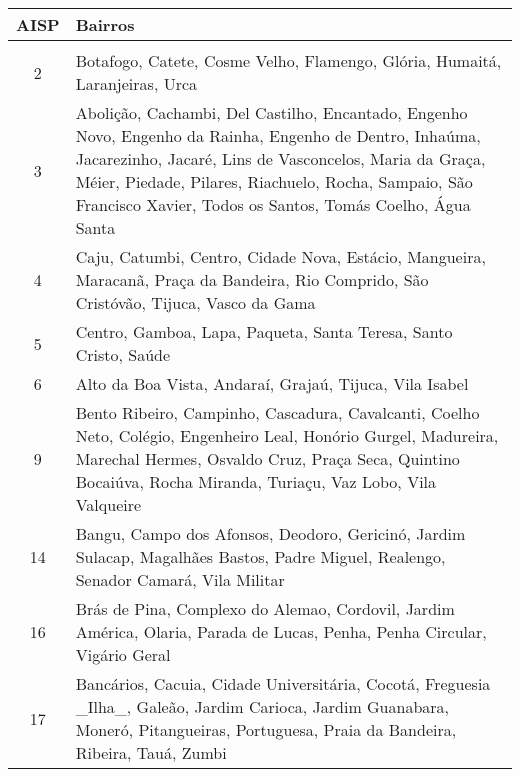 
\begin{table}
\begin{tabular}{cp{12cm}}
\toprule
 AISP &                                                                                                                                                                                                                                                                                  Bairros \\
\midrule
      &                                                                                                                                                                                                                                                                                          \\
 2 &  Botafogo, Catete, Cosme Velho, Flamengo, Glória, Humaitá, Laranjeiras, Urca \\
 3 &  Abolição, Cachambi, Del Castilho, Encantado, Engenho Novo, Engenho da Rainha, Engenho de Dentro, Inhaúma, Jacarezinho, Jacaré, Lins de Vasconcelos, Maria da Graça, Méier, Piedade, Pilares, Riachuelo, Rocha, Sampaio, São Francisco Xavier, Todos os Santos, Tomás Coelho, Água Santa \\
 4 &  Caju, Catumbi, Centro, Cidade Nova, Estácio, Mangueira, Maracanã, Praça da Bandeira, Rio Comprido, São Cristóvão, Tijuca, Vasco da Gama \\
 5 &  Centro, Gamboa, Lapa, Paqueta, Santa Teresa, Santo Cristo, Saúde \\
 6 &  Alto da Boa Vista, Andaraí, Grajaú, Tijuca, Vila Isabel \\
 9 &  Bento Ribeiro, Campinho, Cascadura, Cavalcanti, Coelho Neto, Colégio, Engenheiro Leal, Honório Gurgel, Madureira, Marechal Hermes, Osvaldo Cruz, Praça Seca, Quintino Bocaiúva, Rocha Miranda, Turiaçu, Vaz Lobo, Vila Valqueire \\
 14 &  Bangu, Campo dos Afonsos, Deodoro, Gericinó, Jardim Sulacap, Magalhães Bastos, Padre Miguel, Realengo, Senador Camará, Vila Militar \\
 16 &  Brás de Pina, Complexo do Alemao, Cordovil, Jardim América, Olaria, Parada de Lucas, Penha, Penha Circular, Vigário Geral \\
 17 &  Bancários, Cacuia, Cidade Universitária, Cocotá, Freguesia \_Ilha\_, Galeão, Jardim Carioca, Jardim Guanabara, Moneró, Pitangueiras, Portuguesa, Praia da Bandeira, Ribeira, Tauá, Zumbi \\

\end{tabular}
\end{table}
